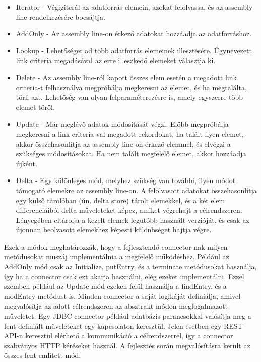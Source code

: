 \begin{itemize}
	\item Iterator - Végigiterál az adatforrás elemein, azokat felolvassa, és az assembly line rendelkezésére bocsájtja.
	\item AddOnly - Az assembly line-on érkező adatokat hozzáadja az adatforráshoz.
	\item Lookup - Lehetőséget ad több adatforrás elemeinek illesztésére. Úgynevezett link criteria megadásával az erre illeszkedő elemeket választja ki.
	\item Delete - Az assembly line-ról kapott összes elem esetén a megadott link criteria-t felhasználva megpróbálja megkeresni az elemet, és ha megtalálta, törli azt. Lehetőség van olyan felparaméterezésre is, amely egyszerre több elemet töröl.
	\item Update - Már meglévő adatok módosítását végzi. Előbb megpróbálja megkeresni a link criteria-val megadott rekordokat, ha talált ilyen elemet, akkor összehasonlítja az assembly line-on érkező elemmel, és elvégzi a szükséges módosításokat. Ha nem talált megfelelő elemet, akkor hozzáadja újként.
	\item Delta - Egy különleges mód, melyhez szükség van további, ilyen módot támogató elemekre az assembly line-on. A felolvasott adatokat összehasonlítja egy külső tárolóban (ún. delta store) tárolt elemekkel, és a két elem differenciáiból delta műveleteket képez, amiket végrehajt a célrendszeren. Lényegében eltárolja a kezelt elemek legutóbb használt verzióját, és csak az újonnan beolvasott elemekhez képesti különbséget hajtja végre.
\end{itemize}

Ezek a módok meghatározzák, hogy a fejlesztendő connector-nak milyen metódusokat muszáj implementálnia a megfelelő működéshez. Például az AddOnly mód csak az Initialize, putEntry, és a terminate metódusokat használja, így ha a connector csak ezt akarja használni, elég ezeket implementálni. Ezzel szemben például az Update mód ezeken felül használja a findEntry, és a modEntry metódust is. Minden connector a saját logikáját definiálja, amivel megvalósítja az adott célrendszeren az absztrakt módon megfogalmazott műveletet. Egy JDBC connector például adatbázis parancsokkal valósítja meg a fent definiált műveleteket egy kapcsolaton keresztül. Jelen esetben egy REST API-n keresztül elérhető a kommunikáció a célrendszerrel, így a connector szabványos HTTP kéréseket használ. A fejlesztés során megvalósításra került az összes fent említett mód.

